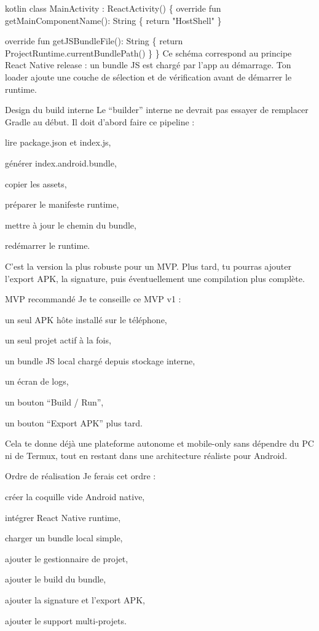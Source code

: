 \documentclass[11pt]{article}
\begin{document}
kotlin
class MainActivity : ReactActivity() \{
  override fun getMainComponentName(): String \{
    return "HostShell"
  \}

  override fun getJSBundleFile(): String \{
    return ProjectRuntime.currentBundlePath()
  \}
\}
Ce schéma correspond au principe React Native release : un bundle JS est chargé par l’app au démarrage. Ton loader ajoute une couche de sélection et de vérification avant de démarrer le runtime.

Design du build interne
Le “builder” interne ne devrait pas essayer de remplacer Gradle au début. Il doit d’abord faire ce pipeline :

lire package.json et index.js,

générer index.android.bundle,

copier les assets,

préparer le manifeste runtime,

mettre à jour le chemin du bundle,

redémarrer le runtime.

C’est la version la plus robuste pour un MVP. Plus tard, tu pourras ajouter l’export APK, la signature, puis éventuellement une compilation plus complète.

MVP recommandé
Je te conseille ce MVP v1 :

un seul APK hôte installé sur le téléphone,

un seul projet actif à la fois,

un bundle JS local chargé depuis stockage interne,

un écran de logs,

un bouton “Build / Run”,

un bouton “Export APK” plus tard.

Cela te donne déjà une plateforme autonome et mobile-only sans dépendre du PC ni de Termux, tout en restant dans une architecture réaliste pour Android.

Ordre de réalisation
Je ferais cet ordre :

créer la coquille vide Android native,

intégrer React Native runtime,

charger un bundle local simple,

ajouter le gestionnaire de projet,

ajouter le build du bundle,

ajouter la signature et l’export APK,

ajouter le support multi-projets.
\end{document}

